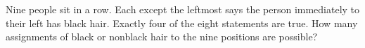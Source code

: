 Nine people sit in a row. Each except the leftmost says the person immediately to their left has black hair. Exactly four of the eight statements are true. How many assignments of black or nonblack hair to the nine positions are possible?
